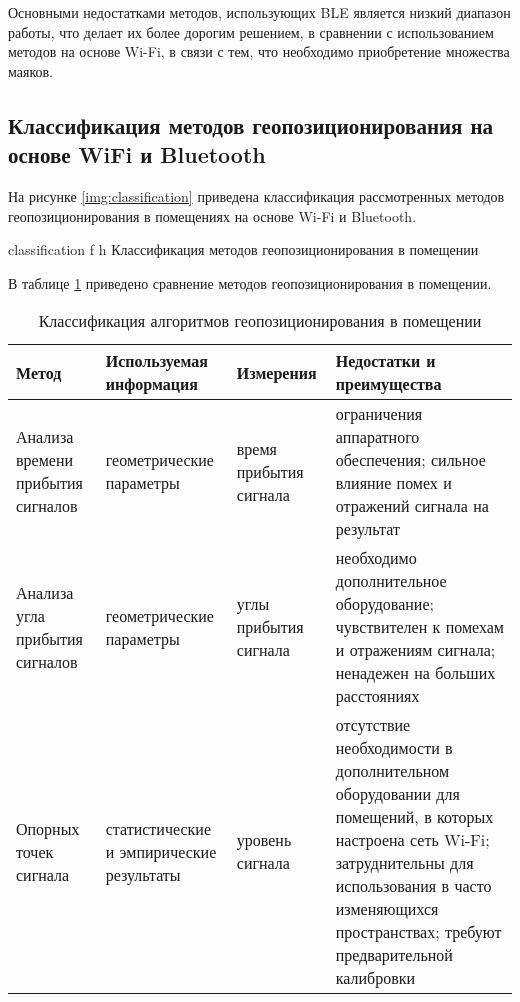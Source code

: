 Основными недостатками методов, использующих BLE является низкий диапазон работы, что делает их более дорогим решением, в сравнении с использованием методов на основе Wi-Fi, в связи с тем, что необходимо приобретение множества маяков.

\clearpage

\subsection{Классификация методов геопозиционирования на основе WiFi и Bluetooth}

На рисунке \ref{img:classification} приведена классификация рассмотренных методов геопозиционирования в помещениях на основе Wi-Fi и Bluetooth.

    {classification}
    {f}
    {h}
    {\linewidth}
    {Классификация методов геопозиционирования в помещении}

\clearpage

В таблице \ref{table:classification} приведено сравнение методов геопозиционирования в помещении.

\begin{table}[ht]
    \caption{Классификация алгоритмов геопозиционирования в помещении}
    \begin{tabular}{|m{3cm}|m{3.5cm}|m{3cm}|m{5.5cm}|}
        \hline
        Метод & Используемая информация & Измерения & Недостатки и преимущества \\
        \hline
        \hline
        Анализа времени прибытия сигналов & геометрические параметры & время прибытия сигнала & ограничения аппаратного обеспечения; сильное влияние помех и отражений сигнала на результат \\
        \hline
        Анализа угла прибытия сигналов & геометрические параметры & углы прибытия сигнала & необходимо дополнительное оборудование; чувствителен к помехам и отражениям сигнала; ненадежен на больших расстояниях \\
        \hline
        Опорных точек сигнала & статистические и эмпирические результаты & уровень сигнала & отсутствие необходимости в дополнительном оборудовании для помещений, в которых настроена сеть Wi-Fi; затруднительны для использования в часто изменяющихся пространствах; требуют предварительной калибровки \\
        \hline
    \end{tabular}
    \label{table:classification}
\end{table}

